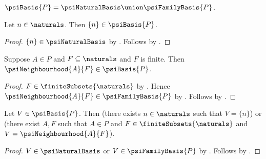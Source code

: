 \begin{definition}\label{psi_basis}
    $\psiBasis{P}=\psiNaturalBasis\union\psiFamilyBasis{P}$.
\end{definition}

\begin{proposition}\label{psi_natural_singleton_in_basis}
    Let $n\in\naturals$.
    Then $\{n\}\in\psiBasis{P}$.
\end{proposition}
\begin{proof}
    $\{n\}\in\psiNaturalBasis$ by .
    Follows by .
\end{proof}

\begin{proposition}\label{psi_neighbourhood_in_basis}
    Suppose $A\in P$ and $F\subseteq\naturals$ and $F$ is finite.
    Then $\psiNeighbourhood{A}{F}\in\psiBasis{P}$.
\end{proposition}
\begin{proof}
    $F\in\finiteSubsets{\naturals}$ by .
    Hence $\psiNeighbourhood{A}{F}\in\psiFamilyBasis{P}$
        by .
    Follows by .
\end{proof}

\begin{proposition}\label{psi_basis_member_cases}
    Let $V\in\psiBasis{P}$.
    Then (there exists $n\in\naturals$ such that $V=\{n\}$) or
        (there exist $A,F$ such that $A\in P$ and
            $F\in\finiteSubsets{\naturals}$ and
            $V=\psiNeighbourhood{A}{F}$).
\end{proposition}
\begin{proof}
    $V\in\psiNaturalBasis$ or $V\in\psiFamilyBasis{P}$
        by .
    Follows by .
\end{proof}

